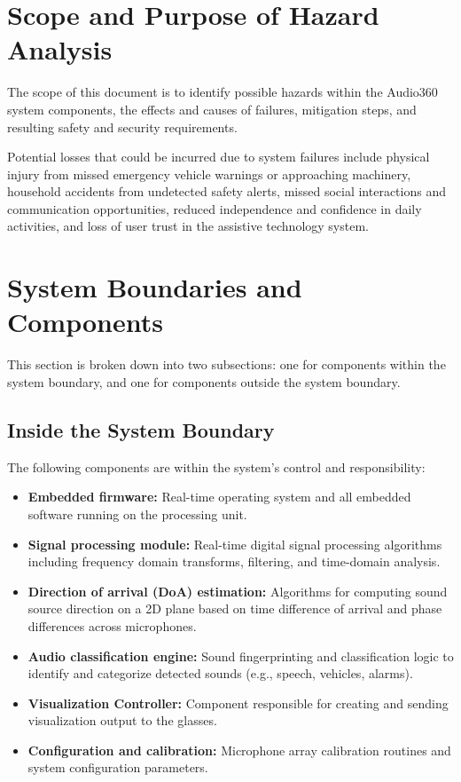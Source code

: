 \documentclass{article}
\begin{document}
\section{Scope and Purpose of Hazard Analysis}

The scope of this document is to identify possible hazards within the Audio360
system components, the effects and causes of failures, mitigation steps, and
resulting safety and security requirements.

Potential losses that could be incurred due to system failures include physical
injury from missed emergency vehicle warnings or approaching machinery,
household accidents from undetected safety alerts, missed social interactions
and communication opportunities, reduced independence and confidence in daily
activities, and loss of user trust in the assistive technology system.

\section{System Boundaries and Components}

This section is broken down into two subsections: one for components within the
system boundary, and one for components outside the system boundary.

\subsection{Inside the System Boundary}

The following components are within the system's control and responsibility:

\begin{itemize}
\item \textbf{Embedded firmware:} Real-time operating system and all embedded
software running on the processing unit.

\item \textbf{Signal processing module:} Real-time digital signal processing
algorithms including frequency domain transforms, filtering, and time-domain
analysis.

\item \textbf{Direction of arrival (DoA) estimation:} Algorithms for computing
sound source direction on a 2D plane based on time difference of arrival and
phase differences across microphones.

\item \textbf{Audio classification engine:} Sound fingerprinting and
classification logic to identify and categorize detected sounds (e.g., speech,
vehicles, alarms).

\item \textbf{Visualization Controller:} \label{comp:viz_controller} Component
responsible for creating and sending visualization output to the glasses.

\item \textbf{Configuration and calibration:} Microphone array calibration
routines and system configuration parameters.
\end{itemize}
\end{document}
